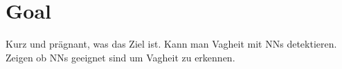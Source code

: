 \section{Goal}
\label{chp:study:sec:goal}
Kurz und prägnant, was das Ziel ist.
Kann man Vagheit mit NNs detektieren.
Zeigen ob \acp{NN} geeignet sind um Vagheit zu erkennen.

